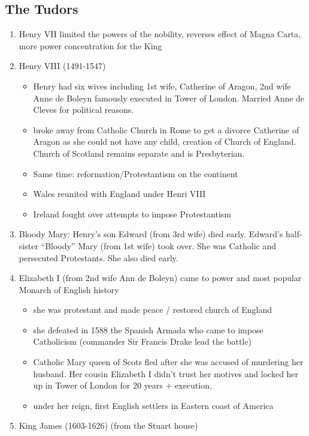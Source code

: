 \documentclass{amsart}
\begin{document}
\subsection{The Tudors}
	\begin{enumerate}
		\item Henry VII limited the powers of the nobility, reverses effect of Magna Carta, more power concentration for the King
 		\item Henry VIII (1491-1547)
 			\begin{itemize}
 				\item Henry had six wives including 1st wife, Catherine of Aragon, 2nd wife Anne de Boleyn famously executed in Tower of London. Married Anne de Cleves for political reasons.
 				\item broke away from Catholic Church in Rome to get a divorce Catherine of Aragon as she could not have any child, creation of Church of England. Church of Scotland remains separate and is Presbyterian.
 				\item Same time: reformation/Protestantism on the continent
 				\item Wales reunited with England under Henri VIII
				\item Ireland fought over attempts to impose Protestantism 
		\end{itemize} 			 
 	\item Bloody Mary: Henry's son Edward (from 3rd wife) died early. Edward's half-sister ``Bloody'' Mary (from 1st wife) took over. She was Catholic and persecuted Protestants.  She also died early.
 	\item Elizabeth I (from 2nd wife Ann de Boleyn) came to power and most popular Monarch of English history
		\begin{itemize} 		
			\item she was protestant and made peace / restored church of England
			\item she defeated in 1588 the Spanish Armada who came to impose Catholicism (commander Sir Francis Drake lead the battle)
			\item Catholic Mary queen of Scots fled after she was accused of murdering her husband. Her cousin Elizabeth I didn't trust her motives and locked her up in Tower of London for 20 years + execution. 
			\item under her reign, first English settlers in Eastern coast of America
		\end{itemize}
	\item King James (1603-1626) (from the Stuart house)

\end{enumerate}
\end{document}
